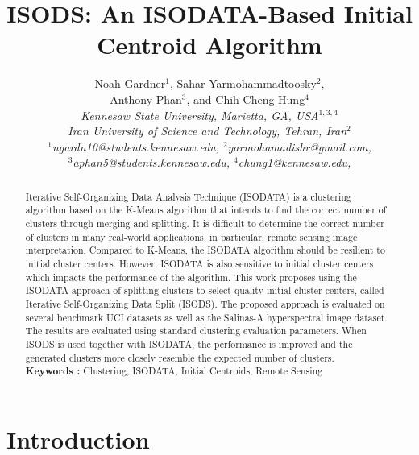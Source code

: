 \documentclass[a4paper, 10pt]{article}
\begin{document}
\title{\bf ISODS: An ISODATA-Based Initial Centroid Algorithm}
\author{Noah Gardner$^1$, Sahar Yarmohammadtoosky$^2$, \\
      Anthony Phan$^3$, and Chih-Cheng Hung$^4$\\[1ex]
      \sl \small Kennesaw State University, Marietta, GA, USA$^{1, 3, 4}$\\
      \sl \small Iran University of Science and Technology, Tehran,
      Iran$^2$\\[1ex]
      \small $^1$ngardn10@students.kennesaw.edu, \small
      $^2$yarmohamadishr@gmail.com, \\
      \small $^3$aphan5@students.kennesaw.edu, \small $^4$chung1@kennesaw.edu,
      \\}
\date{}
\maketitle

\begin{abstract}
      \noindent 
      Iterative Self-Organizing Data Analysis Technique (ISODATA) is a
      clustering algorithm based on the K-Means algorithm that intends to find
      the correct number of clusters through merging and splitting. It is
      difficult to determine the correct number of clusters in many real-world
      applications, in particular, remote sensing image interpretation. Compared
      to K-Means, the ISODATA algorithm should be resilient to initial cluster
      centers. However, ISODATA is also sensitive to initial cluster centers
      which impacts the performance of the algorithm. This work proposes using
      the ISODATA approach of splitting clusters to select quality initial
      cluster centers, called Iterative Self-Organizing Data Split (ISODS). The
      proposed approach is evaluated on several benchmark UCI datasets as well
      as the Salinas-A hyperspectral image dataset. The results are evaluated
      using standard clustering evaluation parameters. When ISODS is used
      together with ISODATA, the performance is improved and the generated
      clusters more closely resemble the expected number of clusters.\\
      {\bf Keywords :} Clustering, ISODATA, Initial Centroids, Remote Sensing
\end{abstract}




\section{Introduction}
\end{document}
